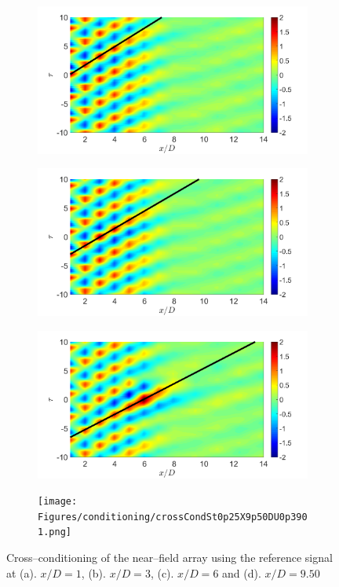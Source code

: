 \begin{figure}
	\centering
	\begin{subfigure}{.5\textwidth}
		\centering
		\includegraphics[width=0.45\linewidth]{Figures/conditioning/crossCondSt0p25X1DU0p6223.png}
		\caption{}
		\label{fig:ch3_farfield_phavg}
	\end{subfigure}%
	\begin{subfigure}{.5\textwidth}
		\centering
		\includegraphics[width=0.45\linewidth]{Figures/conditioning/crossCondSt0p25X3DU0p6647.png}
		\caption{}
		\label{fig:ch3_farfield_phavg}
	\end{subfigure}%
	\begin{subfigure}{.5\textwidth}
		\centering
		\includegraphics[width=0.45\linewidth]{Figures/conditioning/crossCondSt0p25X6DU0p7505.png}
		\caption{}
		\label{fig:ch3_farfield_phavg}
	\end{subfigure}%
	\begin{subfigure}{.5\textwidth}
		\centering
		\texttt{[image: Figures/conditioning/crossCondSt0p25X9p50DU0p3901.png]}
		\caption{}
		\label{fig:ch3_farfield_phavg}
	\end{subfigure}%
	\caption{Cross--conditioning of the near--field array using the reference signal at (a). $x/D = 1$, (b). $x/D=3$, (c). $x/D=6$ and (d). $x/D=9.50$}
	\label{fig:crossCondSt0p25}
\end{figure}
